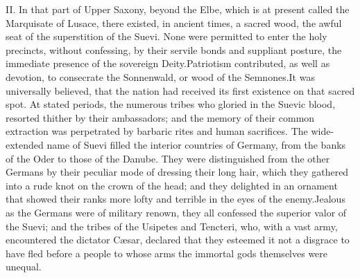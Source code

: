 



II. In that part of Upper Saxony, beyond the Elbe, which is at
present called the Marquisate of Lusace, there existed, in
ancient times, a sacred wood, the awful seat of the superstition
of the Suevi. None were permitted to enter the holy precincts,
without confessing, by their servile bonds and suppliant posture,
the immediate presence of the sovereign Deity.\footnotemark[81] Patriotism
contributed, as well as devotion, to consecrate the Sonnenwald,
or wood of the Semnones.\footnotemark[82] It was universally believed, that the
nation had received its first existence on that sacred spot. At
stated periods, the numerous tribes who gloried in the Suevic
blood, resorted thither by their ambassadors; and the memory of
their common extraction was perpetrated by barbaric rites and
human sacrifices. The wide-extended name of Suevi filled the
interior countries of Germany, from the banks of the Oder to
those of the Danube. They were distinguished from the other
Germans by their peculiar mode of dressing their long hair, which
they gathered into a rude knot on the crown of the head; and they
delighted in an ornament that showed their ranks more lofty and
terrible in the eyes of the enemy.\footnotemark[83] Jealous as the Germans were
of military renown, they all confessed the superior valor of the
Suevi; and the tribes of the Usipetes and Tencteri, who, with a
vast army, encountered the dictator Cæsar, declared that they
esteemed it not a disgrace to have fled before a people to whose
arms the immortal gods themselves were unequal.\footnotemark[84]




